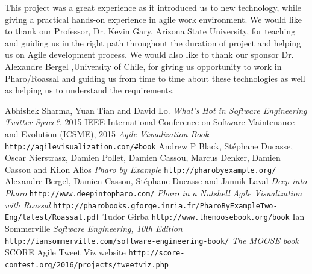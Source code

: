 \documentclass[11pt]{article}
\begin{document}
This project was a great experience as it introduced us to new technology, while giving a practical hands-on experience in agile work environment. We would like to thank our Professor, Dr. Kevin Gary, Arizona State University, for teaching and guiding us in the right path throughout the duration of project and helping us on Agile development process. We would also like to thank our sponsor Dr. Alexandre Bergel ,University of Chile, for giving us opportunity to work in Pharo/Roassal and guiding us from time to time about these technologies as well as helping us to understand the requirements.
\newpage
\begin{thebibliography}{7}
Abhishek Sharma, Yuan Tian and David Lo.
\textit{What's Hot in Software Engineering Twitter Space?}.
2015 IEEE International Conference on Software Maintenance and Evolution (ICSME), 2015
\textit{Agile Visualization Book}
\texttt{http://agilevisualization.com/\#book}
Andrew P Black, Stéphane Ducasse, Oscar Nierstrasz, Damien Pollet, Damien Cassou, Marcus Denker, Damien Cassou and Kilon Alios
\textit{Pharo by Example}
\texttt{http://pharobyexample.org/}
Alexandre Bergel, Damien Cassou, Stéphane Ducasse and Jannik Laval
\textit{Deep into Pharo}
\texttt{http://www.deepintopharo.com/}
\textit{Pharo in a Nutshell}
\textit{Agile Visualization with Roassal}
\texttt{http://pharobooks.gforge.inria.fr/PharoByExampleTwo-Eng/latest/Roassal.pdf}
Tudor Girba
\texttt{http://www.themoosebook.org/book}
Ian Sommerville
\textit{Software Engineering, 10th Edition}
\texttt{http://iansommerville.com/software-engineering-book/}
\textit{The MOOSE book}
SCORE Agile Tweet Viz website
\texttt{http://score-contest.org/2016/projects/tweetviz.php}
\end{thebibliography}
\end{document}
